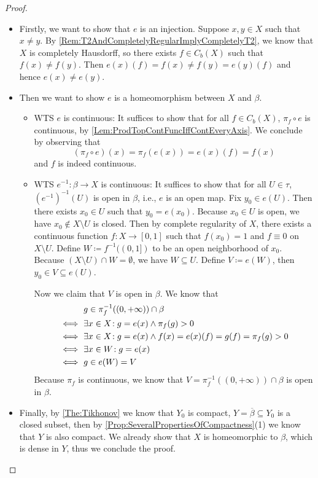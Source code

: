 \documentclass[screen]{techreport}
\numberwithin{equation}{section}
\begin{document}
\begin{proof}\
	\begin{itemize}
		\item Firstly, we want to show that $e$ is an injection.
		Suppose $x,y \in X$ such that $x \neq y$.
		By \cref{Rem:T2AndCompletelyRegularImplyCompletelyT2}, we know that $X$ is completely Hausdorff, so there exists $f \in C_b(X)$ such that $f(x) \neq f(y)$.
		Then $e(x)(f) = f(x) \neq f(y) = e(y)(f)$ and hence $e(x) \neq e(y)$.
		
		\item Then we want to show $e$ is a homeomorphism between $X$ and $\beta$.
		\begin{itemize}
			\item WTS $e$ is continuous: It suffices to show that for all $f \in C_b(X)$, $\pi_f \circ e$ is continuous, by \cref{Lem:ProdTopContFuncIffContEveryAxis}.
			We conclude by observing that
			\[
			(\pi_f \circ e)(x) = \pi_f(e(x)) = e(x)(f) = f(x)
			\]
			and $f$ is indeed continuous.
			\item WTS $e^{-1} : \beta \to X$ is continuous: It suffices to show that for all $U \in \tau$, $(e^{-1})^{-1}(U)$ is open in $\beta$, i.e., $e$ is an open map.
			Fix $y_0 \in e(U)$. Then there exists $x_0 \in U$ such that $y_0 = e(x_0)$.
			Because $x_0 \in U$ is open, we have $x_0 \not\in X \setminus U$ is closed.
			Then by complete regularity of $X$, there exists a continuous function $f : X \to [0,1]$ such that $f(x_0)=1$ and $f \equiv 0$ on $X \setminus U$.
			Define $W \coloneqq f^{-1}((0,1])$ to be an open neighborhood of $x_0$.
			Because $(X \setminus U) \cap W = \emptyset$, we have $W \subseteq U$.
			Define $V \coloneqq e(W)$, then $y_0 \in V \subseteq e(U)$.
			
			Now we claim that $V$ is open in $\beta$. We know that
			\begin{align*}
				& g \in \pi_f^{-1}((0,+\infty)) \cap \beta \\
				\iff~ & \exists {x \in X}\!: g = e(x) \wedge \pi_f(g) > 0 \\
				\iff~ & \exists {x \in X }\!: g=e(x) \wedge f(x)=e(x)(f)=g(f) = \pi_f(g) > 0 \\
				\iff~& \exists {x \in W}\!: g = e(x) \\
				\iff~ & g \in e(W) = V 
			\end{align*}
			Because $\pi_f$ is continuous, we know that $V = \pi^{-1}_f((0,+\infty)) \cap \beta$ is open in $\beta$.
		\end{itemize}
		
		\item Finally, by \cref{The:Tikhonov} we know that $Y_0$ is compact, $Y = \overline{\beta} \subseteq Y_0$ is a closed subset, then by \cref{Prop:SeveralPropertiesOfCompactness}(1) we know that $Y$ is also compact.
		We already show that $X$ is homeomorphic to $\beta$, which is dense in $Y$, thus we conclude the proof.
	\end{itemize}
\end{proof}
\end{document}
